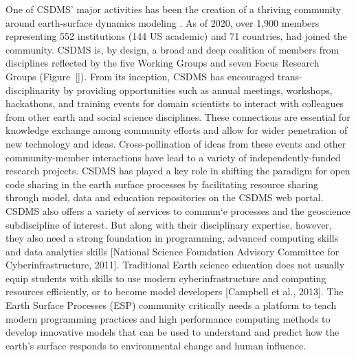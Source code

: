 \documentclass[12pt]{amsart}
\begin{document}
One of CSDMS' major activities has been the creation of a thriving community around earth-surface dynamics modeling \citep{overeem2013strategies}. As of 2020, over 1,900 members representing 552 institutions (144 US academic) and 71 countries, had joined the community.  CSDMS is, by design, a broad and deep coalition of members from disciplines reflected by the five Working Groups and seven Focus Research Groups (Figure~\ref{}).  From its inception, CSDMS has encouraged trans-disciplinarity by providing opportunities such as annual meetings, workshops, hackathons, and training events for domain scientists to interact with colleagues from other earth and social science disciplines.  These connections are essential for knowledge exchange among community efforts and allow for wider penetration of new technology and ideas. Cross-pollination of ideas from these events and other community-member interactions have lead to a variety of independently-funded research projects. CSDMS has played a key role in shifting the paradigm for open code sharing in the earth surface processes by facilitating resource sharing through model, data and education repositories on the CSDMS web portal.  CSDMS also offers a variety of services to commun`e processes and the geoscience subdiscipline of interest.  But along with their disciplinary expertise, however, they also need a strong foundation in programming, advanced computing skills and data analytics skills [National Science Foundation Advisory Committee for Cyberinfrastructure, 2011].
Traditional Earth science education does not usually equip students with skills to use modern cyberinfrastructure and computing resources efficiently, or to become model developers [Campbell et al., 2013]. The Earth Surface Processes (ESP) community critically needs a platform to teach modern programming practices and high performance computing methods to develop innovative models that can be used to understand and predict how the earth’s surface responds to environmental change and human influence.
\end{document}
